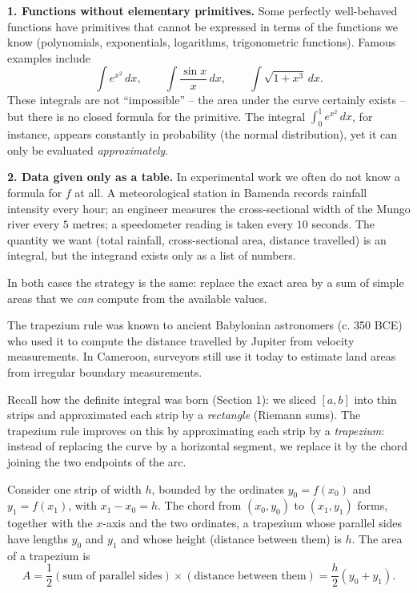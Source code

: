 \documentclass[11pt]{article}
\newcommand{\cle}[1]{{\popxbold\color{popdark}#1}}
\newcounter{popsec}
\newcounter{popsub}
\newcommand{\courssub}[1]{%
  \stepcounter{popsub}%
  \par\vspace{9pt}\noindent{\popxbold\fontsize{11.5}{13}\selectfont\color{popink}{\color{poporange}\thepopsec.\thepopsub}\hspace{6pt}#1}\par\nopagebreak\vspace{4pt}
}
\begin{document}
\textbf{1. Functions without elementary primitives.} Some perfectly well-behaved functions have primitives that cannot be expressed in terms of the functions we know (polynomials, exponentials, logarithms, trigonometric functions). Famous examples include
\[
\int e^{x^2}\,dx, \qquad \int \frac{\sin x}{x}\,dx, \qquad \int \sqrt{1+x^3}\,dx .
\]
These integrals are not ``impossible'' -- the area under the curve certainly exists -- but there is no closed formula for the primitive. The integral $\int_0^1 e^{x^2}\,dx$, for instance, appears constantly in probability (the normal distribution), yet it can only be evaluated \emph{approximately}.

\textbf{2. Data given only as a table.} In experimental work we often do not know a formula for $f$ at all. A meteorological station in Bamenda records rainfall intensity every hour; an engineer measures the cross-sectional width of the Mungo river every $5$ metres; a speedometer reading is taken every $10$ seconds. The quantity we want (total rainfall, cross-sectional area, distance travelled) is an integral, but the integrand exists only as a list of numbers.

In both cases the strategy is the same: replace the exact area by a sum of simple areas that we \emph{can} compute from the available values.

\begin{savaistu}
The trapezium rule was known to ancient Babylonian astronomers (c. 350 BCE) who used it to compute the distance travelled by Jupiter from velocity measurements. In Cameroon, surveyors still use it today to estimate land areas from irregular boundary measurements.
\end{savaistu}

\courssub{From Curves to Chords: One Trapezium}

Recall how the definite integral was born (Section 1): we sliced $[a,b]$ into thin strips and approximated each strip by a \emph{rectangle} (Riemann sums). The trapezium rule improves on this by approximating each strip by a \emph{trapezium}: instead of replacing the curve by a horizontal segment, we replace it by the \cle{chord} joining the two endpoints of the arc.

Consider one strip of width $h$, bounded by the ordinates $y_0 = f(x_0)$ and $y_1 = f(x_1)$, with $x_1 - x_0 = h$. The chord from $(x_0, y_0)$ to $(x_1, y_1)$ forms, together with the $x$-axis and the two ordinates, a trapezium whose parallel sides have lengths $y_0$ and $y_1$ and whose height (distance between them) is $h$. The area of a trapezium is
\[
A = \frac{1}{2}(\text{sum of parallel sides}) \times (\text{distance between them}) = \frac{h}{2}(y_0 + y_1).
\]
\end{document}
